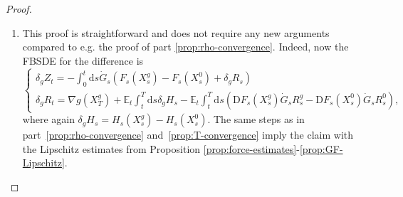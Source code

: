 \documentclass[11pt, a4paper]{scrartcl}
\numberwithin{equation}{section}
\theoremstyle{plain}
\theoremstyle{remark}
\newcommand{\mathD}{\mathrm{D}}
\newcommand{\mathd}{\mathrm{d}}
\newenvironment{enumeratealpha}{\begin{enumerate}[a{\textup{)}}] }{\end{enumerate}}
\begin{document}
\begin{proof}
\begin{enumeratealpha}
		we proceed similarly on $[0, T_2]$ to obtain from Proposition
		\ref{prop:force-estimates}-\ref{prop:fe-T-dependence}
		and \ref{prop:force-estimates}-\ref{prop:GF-bounds},
		\[ \begin{aligned}
				\int_t^{T_2} \mathd s \| H_s^{T_1} (X^{T_1}_s) - H_s^{T_2}
				(X^{T_2}_s) \|_{L^{\infty}} & \lesssim  \bar{\lambda} \sup_s \| \delta_T
				Z_s \|_{L^{\infty}} + \bar{\lambda} \langle T_2 \rangle^{- \varepsilon},
			\end{aligned} \]
		and
		\begin{align*}
			\int_t^{T_2} & \mathd s \| \mathD F_s^{T_1} (X_s^{T_1})  \dot{G}_s
			R_s^{T_1} - \mathD F_s^{T_2} (X_s^{T_2})  \dot{G}_s R_s^{T_2}
			\|_{L^{\infty}}                                                    \\&\lesssim \bar{\lambda} (\sup_s \| \delta_T Z_s
			\|_{L^{\infty}} + \sup_s \| \delta_T R_s \|_{L^{\infty}} + \langle T_2
			\rangle^{- \varepsilon}).
		\end{align*}
		The integrals on $[T_2, T_1]$ can be estimated using just the boundedness
		of the coefficients provided by Proposition
		\ref{prop:force-estimates}-\ref{prop:GF-bounds},
		\begin{align*}
			\int_{T_2}^{T_1} \mathd s \| H_s^{T_1} (X^{T_1}_s) \|_{L^{\infty}} +
			\int_{T_2}^{T_1} \mathd s \| \mathD F_s^{T_1} (X_s^{T_1})  \dot{G}_s
			R_s^{T_1} \|_{L^{\infty}}
			 & \lesssim \bar{\lambda} \int_{T_2}^{T_1} \mathd s
			\langle s \rangle^{- 4 \delta} + \langle s \rangle^{- 1 - \delta} \\
			 & \lesssim \bar{\lambda} \langle T_2 \rangle^{- \varepsilon}.
		\end{align*}
		Finally, by the regularity assumed on $g$,
		\[ \| \nabla g (X^{T_1}_{T_1}) - \nabla g (X^{T_2}_{T_2}) \|_{L^{\infty}}
			\lesssim \bar{\lambda} | g |_{2, \infty}  \| X^{T_1}_{T_2} - X^{T_2}_{T_2}
			\|_{L^{\infty}} \lesssim \bar{\lambda} \sup_s \| \delta X_s \|_{L^{\infty}} .
		\]
		Combining all of the above yields the claim for $\bar{\lambda}$ small enough
		after rearranging.

		\item This proof is straightforward and does not require any new arguments
		compared to e.g. the proof of part \ref{prop:rho-convergence}. Indeed, now
		the FBSDE for the difference is
		\[ \begin{cases}
				\delta_g Z_t = - \int_0^t \mathd s \dot{G}_s (F_s (X^g_s) - F_s
				(X^0_s) + \delta_g R_s) \\
				\delta_g R_t = \nabla g (X^g_T) +\mathbb{E}_t  \int_t^T \mathd s
				\delta_g H_s - \mathbb{E}_t  \int_t^T \mathd s \left( \mathD F_s
				(X^g_s)  \dot{G}_s R^g_s - \mathD F_s  (X_s^0)  \dot{G}_s R_s^0
				\right),
			\end{cases} \]
		where again $\delta_g H_s = H_s (X^g_s) - H_s (X^0_s)$. The same steps as
		in part~\ref{prop:rho-convergence} and~\ref{prop:T-convergence} imply the
		claim with the Lipschitz estimates from Proposition
		\ref{prop:force-estimates}-\ref{prop:GF-Lipschitz}.
	\end{enumeratealpha}
\end{proof}
\end{document}
